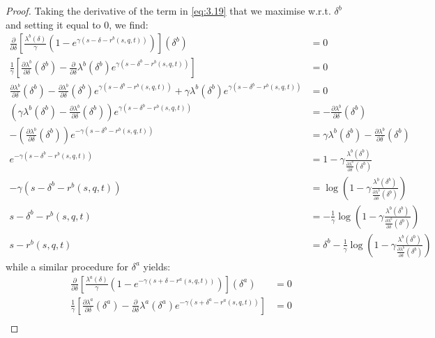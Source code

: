 \begin{proof}
    Taking the derivative of the term in \eqref{eq:3.19} that we maximise w.r.t. $\delta^b$
    and setting it equal to 0, we find:
    \begin{align*}
        \frac{\partial}{\partial\delta}\left[\frac{\lambda^b(\delta)}{\gamma}(1-e^{\gamma(s-\delta-r^b(s,q,t))})\right](\delta^b)&=0\\
        \frac{1}{\gamma}\left[\frac{\partial\lambda^b}{\partial\delta}(\delta^b)-\frac{\partial}{\partial\delta}\lambda^b(\delta^b)e^{\gamma(s-\delta^b-r^b(s,q,t))}\right]&=0\\
        \frac{\partial\lambda^b}{\partial\delta}(\delta^b)-\frac{\partial\lambda^b}{\partial\delta}(\delta^b)e^{\gamma(s-\delta^b-r^b(s,q,t))}+\gamma\lambda^b(\delta^b)e^{\gamma(s-\delta^b-r^b(s,q,t))}&=0\\
        \left(\gamma\lambda^b(\delta^b)-\frac{\partial\lambda^b}{\partial\delta}(\delta^b)\right)e^{\gamma(s-\delta^b-r^b(s,q,t))}&=-\frac{\partial\lambda^b}{\partial\delta}(\delta^b)\\
        -\left(\frac{\partial\lambda^b}{\partial\delta}(\delta^b)\right)e^{-\gamma(s-\delta^b-r^b(s,q,t))}&=\gamma\lambda^b(\delta^b)-\frac{\partial\lambda^b}{\partial\delta}(\delta^b)\\
        e^{-\gamma(s-\delta^b-r^b(s,q,t))}&=1-\gamma\frac{\lambda^b(\delta^b)}{\frac{\partial\lambda^b}{\partial\delta}(\delta^b)}\\
        -\gamma(s-\delta^b-r^b(s,q,t))&=\log\left(1-\gamma\frac{\lambda^b(\delta^b)}{\frac{\partial\lambda^b}{\partial\delta}(\delta^b)}\right)\\
        s-\delta^b-r^b(s,q,t)&=-\frac{1}{\gamma}\log\left(1-\gamma\frac{\lambda^b(\delta^b)}{\frac{\partial\lambda^b}{\partial\delta}(\delta^b)}\right)\\
        s-r^b(s,q,t)&=\delta^b-\frac{1}{\gamma}\log\left(1-\gamma\frac{\lambda^b(\delta^b)}{\frac{\partial\lambda^b}{\partial\delta}(\delta^b)}\right)
    \end{align*}
    while a similar procedure for $\delta^a$ yields:
    \begin{align*}
        \frac{\partial}{\partial\delta}\left[\frac{\lambda^a(\delta)}{\gamma}(1-e^{-\gamma(s+\delta-r^a(s,q,t))})\right](\delta^a)&=0\\
        \frac{1}{\gamma}\left[\frac{\partial\lambda^a}{\partial\delta}(\delta^a)-\frac{\partial}{\partial\delta}\lambda^a(\delta^a)e^{-\gamma(s+\delta^a-r^a(s,q,t))}\right]&=0\\

\end{align*}
\end{proof}

